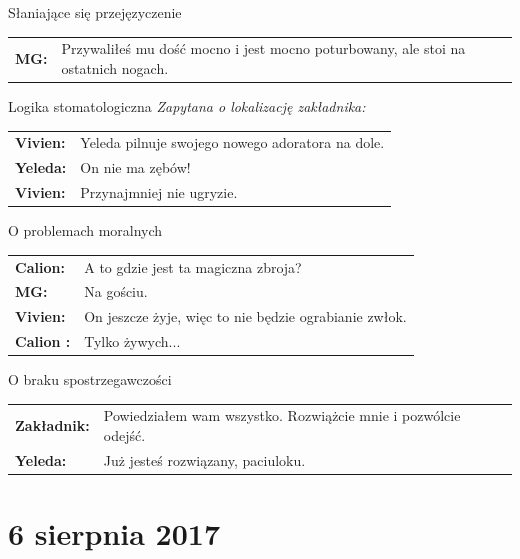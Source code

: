 \documentclass[10pt,twoside,twocolumn]{book}
\begin{document}
\begin{rpg-quotebox}{Słaniające się przejęzyczenie}
   \begin{tabularx}{\columnwidth}{lX}
      \textbf{MG:} & Przywaliłeś mu dość mocno i jest mocno poturbowany, ale stoi na ostatnich nogach.\\
   \end{tabularx}
\end{rpg-quotebox}


\begin{rpg-quotebox}{Logika stomatologiczna}
   \textit{Zapytana o lokalizację zakładnika:} \\

   \begin{tabularx}{\columnwidth}{lX}
      \textbf{Vivien:} & Yeleda pilnuje swojego nowego adoratora na dole.\\
      \textbf{Yeleda:} & On nie ma zębów!\\
      \textbf{Vivien:} & Przynajmniej nie ugryzie.\\
   \end{tabularx}
\end{rpg-quotebox}


\begin{rpg-quotebox}{O problemach moralnych}
   \begin{tabularx}{\columnwidth}{lX}
      \textbf{Calion:} & A to gdzie jest ta magiczna zbroja?\\
      \textbf{MG:} & Na gościu.\\
      \textbf{Vivien:} & On jeszcze żyje, więc to nie będzie ograbianie zwłok.\\
      \textbf{Calion :} & Tylko żywych...\\
   \end{tabularx}
\end{rpg-quotebox}


\begin{rpg-quotebox}{O braku spostrzegawczości}
   \begin{tabularx}{\columnwidth}{lX}
      \textbf{Zakładnik:} & Powiedziałem wam wszystko. Rozwiążcie mnie i pozwólcie odejść.\\
      \textbf{Yeleda:} & Już jesteś rozwiązany, paciuloku.\\
   \end{tabularx}
\end{rpg-quotebox}


\section*{6 sierpnia 2017}
\end{document}
